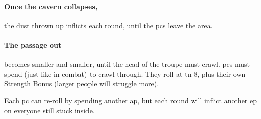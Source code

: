 \begin{multicols}{2}
\paragraph{Once the cavern collapses,}
the dust thrown up inflicts  each \gls{round}, until the \glspl{pc} leave the \gls{area}.

\paragraph{The passage out}
becomes smaller and smaller, until the head of the troupe must crawl.
\Glspl{pc} must spend  (just like in combat) to crawl through.
They roll  at \gls{tn} 8, plus their own Strength Bonus (larger people will struggle more).

Each \gls{pc} can re-roll by spending another \gls{ap}, but each \gls{round} will inflict another \gls{ep} on everyone still stuck inside.

\end{multicols}

